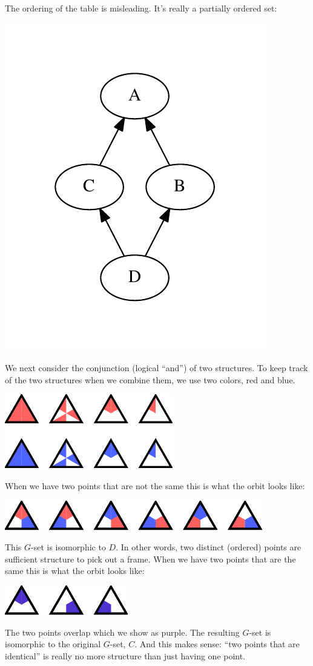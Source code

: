 \documentclass[11pt,oneside]{article}
\begin{document}
The ordering of the table is misleading.
It's really a partially ordered set:
\begin{center}
\includegraphics[width=0.3\columnwidth]{subgroups_s3.pdf} 
\end{center}

We next consider the conjunction (logical ``and'')
of two structures.
To keep track of the two structures when we combine them,
we use two colors, red and blue. 
\begin{center}
\includegraphics[]{pic-triangle-pairs.pdf} 
\end{center}
When we have two points that are not the same
this is what the orbit looks like:
\begin{center}
\includegraphics[]{pic-triangle-point-point-ne.pdf} 
\end{center}
This $G$-set is isomorphic to $D$. In other words,
two distinct (ordered) points are sufficient structure to pick
out a frame.
When we have two points that are the same
this is what the orbit looks like:
\begin{center}
\includegraphics[]{pic-triangle-point-point-eq.pdf} 
\end{center}
The two points overlap which we show as purple. The resulting
$G$-set is isomorphic to the original $G$-set, $C.$
And this makes sense: ``two points that are identical''
is really no more structure than just having one point.
\end{document}
